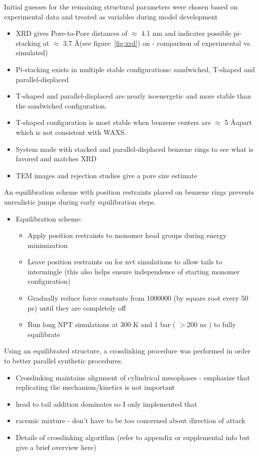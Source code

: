 \documentclass{article}
\newcommand{\angstrom}{\textup{\AA}}
\begin{document}
	\noindent Initial guesses for the remaining structural parameters were chosen based on experimental data and treated as variables during model development 
	\begin{itemize}
		\item XRD gives Pore-to-Pore distances of $\approx$ 4.1 nm and indicates possible pi-stacking at $\approx$ 3.7 \angstrom (see figure~\ref{fig:xrd}) on - comparison of experimental vs. simulated)
		\item Pi-stacking exists in multiple stable configurations: sandwiched, T-shaped and parallel-displaced
		\item T-shaped and parallel-displaced are nearly isoenergetic and more stable than the sandwiched configuration.
		\item T-shaped configuration is most stable when benzene centers are $\approx$ 5 \angstrom apart which is not consistent with WAXS. %
		\item System made with stacked and parallel-displaced benzene rings to see what is favored and matches XRD
		\item TEM images and rejection studies give a pore size estimate
	\end{itemize}

	An equilibration scheme with position restraints placed on benzene rings prevents unrealistic jumps during early equilibration steps.
	\begin{itemize}
		\item Equilibration scheme:
		\begin{itemize}
			\item Apply position restraints to monomer head groups during energy minimization 
			\item Leave position restraints on for nvt simulations to allow tails to intermingle (this also helps ensure independence of starting monomer configuration)
			\item Gradually reduce force constants from 1000000 (by square root every 50 ps) until they are completely off
			\item Run long NPT simulations at 300 K and 1 bar ( $>$200 ns ) to fully equilibrate 
		\end{itemize}
	\end{itemize}
	
	Using an equilibrated structure, a crosslinking procedure was performed in order to better parallel synthetic procedures. 
	\begin{itemize}
		\item Crosslinking maintains alignment of cylindrical mesophases - emphasize that replicating the mechanism/kinetics is not important 
		\item head to tail addition dominates so I only implemented that
		\item racemic mixture - don't have to be too concerned about direction of attack 
		\item Details of crosslinking algorithm (refer to appendix or supplemental info but give a brief overview here)
	\end{itemize}  
	
\end{document}
